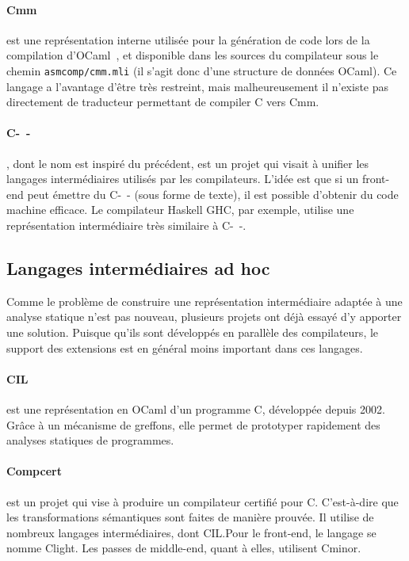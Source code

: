 \paragraph{Cmm} est une représentation interne utilisée pour la génération de
code lors de la compilation d'OCaml~, et disponible dans
les sources du compilateur sous le chemin \texttt{asmcomp/cmm.mli} (il s'agit
donc d'une structure de données OCaml). Ce langage a l'avantage d'être très
restreint, mais malheureusement il n'existe pas directement de traducteur
permettant de compiler C vers Cmm.

\paragraph{C-~-}\cite{spjcmm} , dont le nom est inspiré du précédent,
est un projet qui visait à unifier les langages intermédiaires utilisés par les
compilateurs. L'idée est que si un front-end peut émettre du C-~- (sous forme de
texte), il est possible d'obtenir du code machine efficace. Le compilateur
Haskell GHC, par exemple, utilise une représentation intermédiaire très
similaire à C-~-.

\subsection*{Langages intermédiaires ad hoc}

Comme le problème de construire une représentation intermédiaire adaptée à une
analyse statique n'est pas nouveau, plusieurs projets ont déjà essayé d'y
apporter une solution. Puisque qu'ils sont développés en parallèle des
compilateurs, le support des extensions est en général moins important dans ces
langages.

\paragraph{CIL}\cite{NeculaCil}  est une représentation en
OCaml d'un programme C, développée depuis 2002. Grâce à un mécanisme de
greffons, elle permet de prototyper rapidement des analyses statiques de
programmes.

\paragraph{Compcert} est un projet qui vise à produire un compilateur certifié
pour C. C'est-à-dire que les transformations sémantiques sont faites de manière
prouvée. Il utilise de nombreux langages intermédiaires, dont CIL.\@ Pour le
front-end, le langage se nomme Clight\cite{cfront}. Les passes de middle-end,
quant à elles, utilisent Cminor\cite{cminorSL}.

